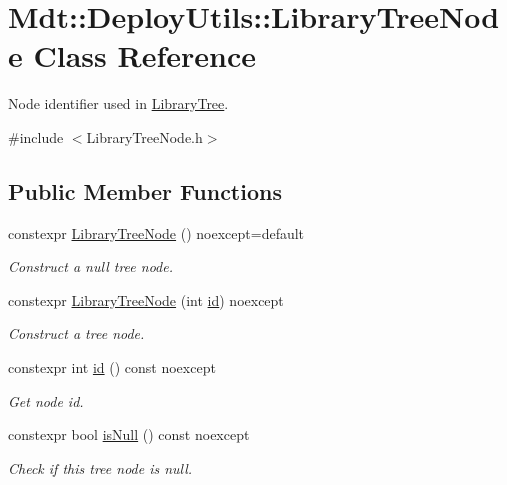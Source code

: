 \hypertarget{class_mdt_1_1_deploy_utils_1_1_library_tree_node}{}\section{Mdt\+:\+:Deploy\+Utils\+:\+:Library\+Tree\+Node Class Reference}
\label{class_mdt_1_1_deploy_utils_1_1_library_tree_node}


Node identifier used in \hyperlink{class_mdt_1_1_deploy_utils_1_1_library_tree}{Library\+Tree}.  




{\ttfamily \#include $<$Library\+Tree\+Node.\+h$>$}

\subsection*{Public Member Functions}
\begin{DoxyCompactItemize}
\item 
constexpr \hyperlink{class_mdt_1_1_deploy_utils_1_1_library_tree_node_aacfee766b6cb39f40f9f50eb13f5df89}{Library\+Tree\+Node} () noexcept=default
\begin{DoxyCompactList}\small\item\em Construct a null tree node. \end{DoxyCompactList}\item 
constexpr \hyperlink{class_mdt_1_1_deploy_utils_1_1_library_tree_node_af38e2a3d67cf1886cb8d123ef3ac3e95}{Library\+Tree\+Node} (int \hyperlink{class_mdt_1_1_deploy_utils_1_1_library_tree_node_a9037c5b96dbe3566e9d5508c724b4afc}{id}) noexcept
\begin{DoxyCompactList}\small\item\em Construct a tree node. \end{DoxyCompactList}\item 
constexpr int \hyperlink{class_mdt_1_1_deploy_utils_1_1_library_tree_node_a9037c5b96dbe3566e9d5508c724b4afc}{id} () const noexcept
\begin{DoxyCompactList}\small\item\em Get node id. \end{DoxyCompactList}\item 
constexpr bool \hyperlink{class_mdt_1_1_deploy_utils_1_1_library_tree_node_a40ab57463b9ba93f9cc0b6b7ab33aed8}{is\+Null} () const noexcept
\begin{DoxyCompactList}\small\item\em Check if this tree node is null. \end{DoxyCompactList}\end{DoxyCompactItemize}


